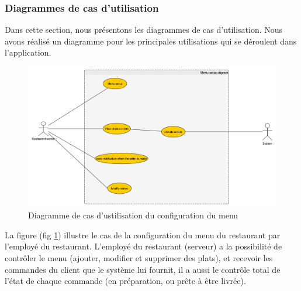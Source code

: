 \documentclass[french, a4paper, 12pt]{report}
\begin{document}
		\newpage
		\subsubsection{Diagrammes de cas d’utilisation} Dans cette section, nous présentons les diagrammes de cas d'utilisation. Nous avons réalisé un diagramme pour les principales utilisations qui se déroulent dans l'application. 
		
			
			\begin{figure}[!h]
  				\center
  				\includegraphics[width=15cm]{usecasemenu.png}
  				\caption{Diagramme de cas d'ustilisation du configuration du menu}
  				\label{fig:usecasemenu}
			\end{figure}
			
			La figure (fig \ref{fig:usecasemenu}) illustre le cas de la configuration du menu du restaurant par l'employé du restaurant. L'employé du restaurant (serveur) a la possibilité de contrôler
le menu (ajouter, modifier et supprimer des plats), et recevoir les commandes du client que le système lui fournit,
il a aussi le contrôle total de l'état de chaque commande (en préparation, ou prête à être livrée).
			
\end{document}

